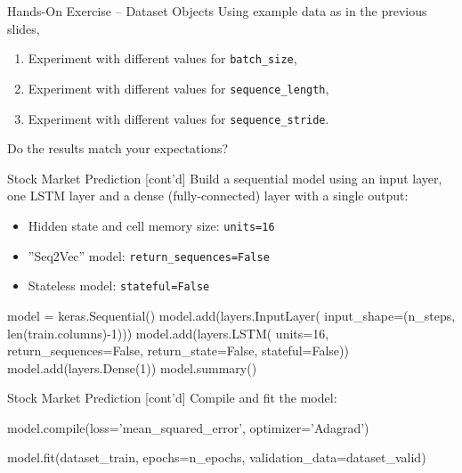 \documentclass[ignorenonframetext,xcolor=x11names]{beamer}
\begin{document}
\begin{frame}{Hands-On Exercise -- Dataset Objects}
Using example data as in the previous slides,
\begin{enumerate}
   \item Experiment with different values for \texttt{batch\_size},
   \item Experiment with different values for \texttt{sequence\_length},
   \item Experiment with different values for \texttt{sequence\_stride}.
\end{enumerate}
Do the results match your expectations?
\end{frame}

\begin{frame}[fragile]{Stock Market Prediction \small [cont'd]}
Build a sequential model using an input layer, one LSTM layer and a dense (fully-connected) layer with a single output:
\begin{itemize}
   \item Hidden state and cell memory size: \texttt{units=16}
   \item ''Seq2Vec'' model: \texttt{return\_sequences=False}
   \item Stateless model: \texttt{stateful=False}
\end{itemize}

\begin{pythoncode}
model = keras.Sequential()
model.add(layers.InputLayer(
    input_shape=(n_steps, len(train.columns)-1)))
model.add(layers.LSTM(
    units=16,
    return_sequences=False,
    return_state=False,
    stateful=False))
model.add(layers.Dense(1))
model.summary()
\end{pythoncode}
\end{frame} 

\begin{frame}[fragile]{Stock Market Prediction \small [cont'd]}
Compile and fit the model:
\begin{pythoncode}
model.compile(loss='mean_squared_error',
              optimizer='Adagrad')

model.fit(dataset_train,
          epochs=n_epochs,
          validation_data=dataset_valid)
\end{pythoncode}
\end{frame}
\end{document}
